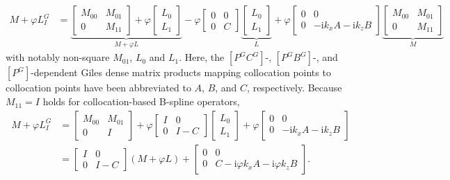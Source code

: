 \documentclass[letterpaper,11pt,nointlimits,reqno,draft]{amsbook}
\newcommand{\ii}{\ensuremath{\mathrm{i}}}
\begin{document}
\begin{align}
    \label{eq:dimeulertransformevolve_linearpartition}
    M + \varphi{}L_I^G
&=
    \underbrace{
    \begin{bmatrix} M_{00} & M_{01} \\ 0 & M_{11} \end{bmatrix}
    +
    \varphi
    \begin{bmatrix} L_{0} \\ L_{1} \end{bmatrix}
    }_{M + \varphi{}L}
    -
    \varphi
    \begin{bmatrix} 0 & 0 \\ 0 & C \end{bmatrix}
    \underbrace{
    \begin{bmatrix} L_{0} \\ L_{1} \end{bmatrix}
    }_L
    +
    \varphi
    \begin{bmatrix} 0 & 0 \\ 0 & - \ii k_x A - \ii k_z B \end{bmatrix}
    \underbrace{
    \begin{bmatrix} M_{00} & M_{01} \\ 0 & M_{11} \end{bmatrix}
    }_M
\end{align}
with notably non-square $M_{01}$, $L_0$ and $L_1$.  Here, the $\left[P^G
C^G\right]$-, $\left[P^G B^G\right]$-, and $\left[P^G\right]$-dependent Giles
dense matrix products mapping collocation points to collocation points have been
abbreviated to $A$, $B$, and $C$, respectively. Because $M_{11} = I$ holds for
collocation-based B-spline operators,
\begin{align}
    M + \varphi{}L_I^G
&=
    \begin{bmatrix} M_{00} & M_{01} \\ 0 & I \end{bmatrix}
    +
    \varphi
    \begin{bmatrix} I & 0 \\ 0 & I - C \end{bmatrix}
    \begin{bmatrix} L_{0} \\ L_{1} \end{bmatrix}
    +
    \varphi
    \begin{bmatrix} 0 & 0 \\ 0 & - \ii k_x A - \ii k_z B \end{bmatrix}
\\
&=
    \label{eq:dimeulertransformevolve_linearfact}
    \begin{bmatrix} I & 0 \\ 0 & I - C \end{bmatrix}
    \left(M + \varphi{}L\right)
    +
    \begin{bmatrix}
        0 & 0 \\
        0 & C - \ii \varphi{} k_x A - \ii \varphi{} k_z B
    \end{bmatrix}.
\end{align}
\end{document}
